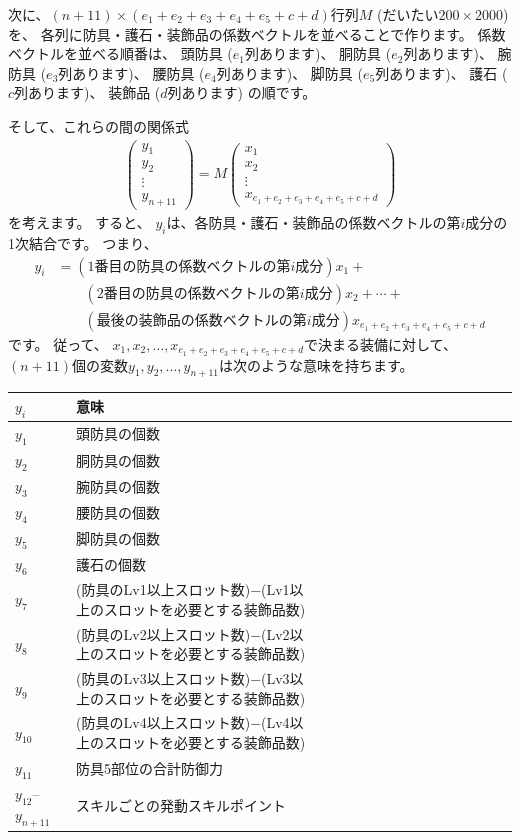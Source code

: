\documentclass{jsarticle}
\begin{document}
次に、$(n+11) \times (e_1+e_2+e_3+e_4+e_5+c+d)$行列$M$
(だいたい$200 \times 2000$) を、
各列に防具・護石・装飾品の係数ベクトルを並べることで作ります。
係数ベクトルを並べる順番は、
頭防具 ($e_1$列あります)、
胴防具 ($e_2$列あります)、
腕防具 ($e_3$列あります)、
腰防具 ($e_4$列あります)、
脚防具 ($e_5$列あります)、
護石   ($c$列あります)、
装飾品 ($d$列あります) の順です。

そして、これらの間の関係式
\begin{align*}
\begin{pmatrix}
y_1 \\ y_2 \\ \vdots \\ y_{n+11}
\end{pmatrix}
=
M
\begin{pmatrix}
x_1 \\ x_2 \\ \vdots \\ x_{e_1+e_2+e_3+e_4+e_5+c+d}
\end{pmatrix}
\tag{$y$と$x$の関係式}
\end{align*}
を考えます。
%
すると、
$y_i$は、各防具・護石・装飾品の係数ベクトルの第$i$成分の1次結合です。
つまり、
\begin{align*}
y_i &= 
(\text{1番目の防具の係数ベクトルの第$i$成分}) x_1 +
\\ &\quad\quad
(\text{2番目の防具の係数ベクトルの第$i$成分}) x_2 +
\cdots +
\\ &\quad\quad
(\text{最後の装飾品の係数ベクトルの第$i$成分}) x_{e_1+e_2+e_3+e_4+e_5+c+d}
\end{align*}
です。
%
従って、
$x_1, x_2, \ldots, x_{e_1+e_2+e_3+e_4+e_5+c+d}$で決まる装備に対して、
$(n+11)$個の変数$y_1, y_2, \ldots, y_{n+11}$は次のような意味を持ちます。
%
\begin{center}
\begin{tabular}{llllllllllllllll}
\toprule
$y_i$ & 意味 \\
\midrule
$y_1$ & 頭防具の個数 \\
$y_2$ & 胴防具の個数 \\
$y_3$ & 腕防具の個数 \\
$y_4$ & 腰防具の個数 \\
$y_5$ & 脚防具の個数 \\
\midrule
$y_6$ & 護石の個数 \\
\midrule
$y_7$ & (防具のLv1以上スロット数)$-$(Lv1以上のスロットを必要とする装飾品数) \\
$y_8$ & (防具のLv2以上スロット数)$-$(Lv2以上のスロットを必要とする装飾品数) \\
$y_9$ & (防具のLv3以上スロット数)$-$(Lv3以上のスロットを必要とする装飾品数) \\
$y_{10}$&(防具のLv4以上スロット数)$-$(Lv4以上のスロットを必要とする装飾品数) \\
\midrule
$y_{11}$ & 防具5部位の合計防御力 \\
\midrule
$y_{12}$--$y_{n+11}$ & スキルごとの発動スキルポイント
\\ \bottomrule
\end{tabular}
\end{center}
\end{document}
